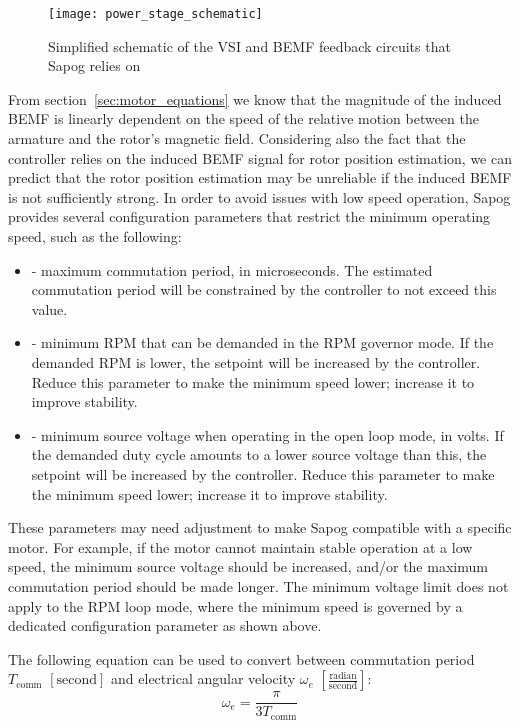 \documentclass{zubaxdoc}
\begin{document}
	\begin{figure}[hbt]
		\centering
		\texttt{[image: power\_stage\_schematic]}
		\caption{Simplified schematic of the VSI and BEMF feedback circuits that Sapog relies on
			\label{power_stage_schematic}}
	\end{figure}
	
	From section~\ref{sec:motor_equations} we know that the magnitude of the induced BEMF is linearly
	dependent on the speed of the relative motion between the armature and the rotor's magnetic field.
	Considering also the fact that the controller relies on the induced BEMF signal for rotor position estimation,
	we can predict that the rotor position estimation may be unreliable if the induced BEMF is not sufficiently
	strong.
	In order to avoid issues with low speed operation, Sapog provides several configuration parameters that
	restrict the minimum operating speed, such as the following:
	
	\begin{itemize}
		\item {} - maximum commutation period, in microseconds.
		The estimated commutation period will be constrained by the controller to not exceed this value.
		\item {} - minimum RPM that can be demanded in the RPM governor mode.
		If the demanded RPM is lower, the setpoint will be increased by the controller.
		Reduce this parameter to make the minimum speed lower; increase it to improve stability.
		\item {} - minimum source voltage when operating in the open loop mode, in volts.
		If the demanded duty cycle amounts to a lower source voltage than this, the setpoint will be
		increased by the controller.
		Reduce this parameter to make the minimum speed lower; increase it to improve stability.
	\end{itemize}
	
	These parameters may need adjustment to make Sapog compatible with a specific motor.
	For example, if the motor cannot maintain stable operation at a low speed,
	the minimum source voltage should be increased,
	and/or the maximum commutation period should be made longer.
	The minimum voltage limit does not apply to the RPM loop mode,
	where the minimum speed is governed by a dedicated configuration parameter as shown above.
	
	The following equation can be used to convert between commutation period $T_\text{comm}$
	$\left[\text{second}\right]$
	and electrical angular velocity $\omega_e$ $\left[\frac{\text{radian}}{\text{second}}\right]$:
	\begin{equation}
		\omega_e = \frac{\pi}{3 T_\text{comm}}
	\end{equation}
	
\end{document}

